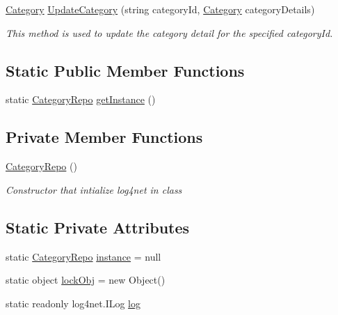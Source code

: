 \begin{DoxyCompactItemize}
\hyperlink{classWildLifeTracker_1_1Models_1_1Category}{Category} \hyperlink{classWildLifeTracker_1_1Repository_1_1CategoryRepo_a1dfdbf9282dc67bc63171f404d89291c}{Update\+Category} (string category\+Id, \hyperlink{classWildLifeTracker_1_1Models_1_1Category}{Category} category\+Details)
\begin{DoxyCompactList}\small\item\em This method is used to update the category detail for the specified category\+Id. \end{DoxyCompactList}\end{DoxyCompactItemize}
\subsection*{Static Public Member Functions}
\begin{DoxyCompactItemize}
\item 
static \hyperlink{classWildLifeTracker_1_1Repository_1_1CategoryRepo}{Category\+Repo} \hyperlink{classWildLifeTracker_1_1Repository_1_1CategoryRepo_a830fdfa06499b071009c5b454e08c114}{get\+Instance} ()
\end{DoxyCompactItemize}
\subsection*{Private Member Functions}
\begin{DoxyCompactItemize}
\item 
\hyperlink{classWildLifeTracker_1_1Repository_1_1CategoryRepo_ad9e76050687bbd1c1e68368d424475ef}{Category\+Repo} ()
\begin{DoxyCompactList}\small\item\em Constructor that intialize log4net in class \end{DoxyCompactList}\end{DoxyCompactItemize}
\subsection*{Static Private Attributes}
\begin{DoxyCompactItemize}
\item 
static \hyperlink{classWildLifeTracker_1_1Repository_1_1CategoryRepo}{Category\+Repo} \hyperlink{classWildLifeTracker_1_1Repository_1_1CategoryRepo_ac921edd1d88c6a3406c9838ccd0f76ee}{instance} = null
\item 
static object \hyperlink{classWildLifeTracker_1_1Repository_1_1CategoryRepo_a38ff5bc3c19841e1e23deb0481c9816c}{lock\+Obj} = new Object()
\item 
static readonly log4net.\+I\+Log \hyperlink{classWildLifeTracker_1_1Repository_1_1CategoryRepo_ae6c6142b8525b2f4ac6ee6e003b3106f}{log}
\end{DoxyCompactItemize}


